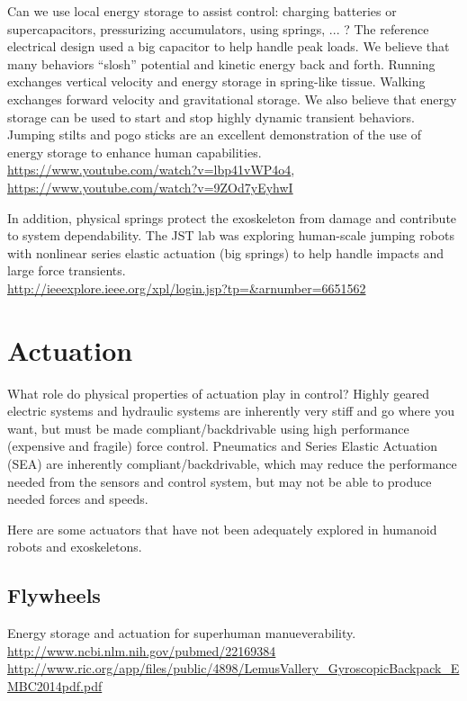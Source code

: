 \documentclass[letterpaper,12pt,fullpage]{article}
\begin{document}
Can we use local energy storage to assist control: charging batteries or
supercapacitors, pressurizing accumulators, using springs, ... ?
The reference electrical design used a big capacitor to help handle
peak loads. We believe that many behaviors ``slosh'' potential and
kinetic energy back and forth.
Running exchanges vertical velocity and energy storage in spring-like
tissue.
Walking exchanges forward velocity and gravitational storage.
We also believe that energy storage can be used to start and stop
highly dynamic transient behaviors.
Jumping stilts and pogo sticks are an excellent demonstration
of the use of energy storage to enhance human
capabilities.\\
\url{https://www.youtube.com/watch?v=lbp41vWP4o4},\\
\url{https://www.youtube.com/watch?v=9ZOd7yEyhwI}

In addition, physical springs protect the exoskeleton from damage
and contribute to system dependability.
The JST lab was exploring human-scale jumping robots
with 
nonlinear series elastic actuation (big springs)
to help handle impacts and large force
transients.\\
\url{http://ieeexplore.ieee.org/xpl/login.jsp?tp=&arnumber=6651562}\\

\section{Actuation}

What role do physical properties of actuation play in control? Highly
geared electric systems and hydraulic systems are inherently very
stiff and go where you want, but must be made compliant/backdrivable
using high performance (expensive and fragile) force control.
Pneumatics and Series Elastic Actuation (SEA) are inherently
compliant/backdrivable, which may reduce the performance
needed from the sensors and control system, but may not be able to
produce needed forces and speeds.

Here are some actuators
that have not been adequately explored
in humanoid robots and exoskeletons.

\subsection{Flywheels}

Energy storage and actuation for superhuman manueverability.\\
\url{http://www.ncbi.nlm.nih.gov/pubmed/22169384}\\
\url{http://www.ric.org/app/files/public/4898/LemusVallery_GyroscopicBackpack_EMBC2014pdf.pdf}
\end{document}
